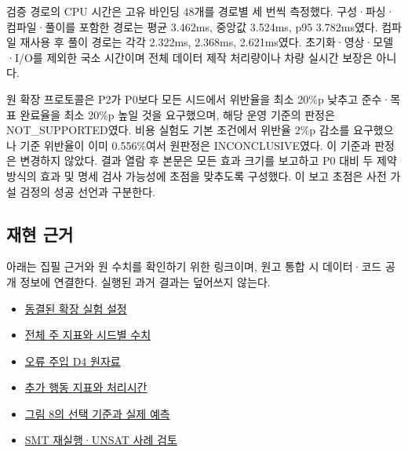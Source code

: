 \documentclass[11pt,a4paper]{article}
\begin{document}
검증 경로의 CPU 시간은 고유 바인딩 48개를 경로별 세 번씩 측정했다. 구성·파싱·컴파일·풀이를 포함한 경로는 평균 3.462ms, 중앙값 3.524ms, p95 3.782ms였다. 컴파일 재사용 후 풀이 경로는 각각 2.322ms, 2.368ms, 2.621ms였다. 초기화·영상·모델·I/O를 제외한 국소 시간이며 전체 데이터 제작 처리량이나 차량 실시간 보장은 아니다.\par

원 확장 프로토콜은 P2가 P0보다 모든 시드에서 위반율을 최소 20\%p 낮추고 준수·목표 완료율을 최소 20\%p 높일 것을 요구했으며, 해당 운영 기준의 판정은 NOT\_SUPPORTED였다. 비용 실험도 기본 조건에서 위반율 2\%p 감소를 요구했으나 기준 위반율이 이미 0.556\%여서 원판정은 INCONCLUSIVE였다. 이 기준과 판정은 변경하지 않았다. 결과 열람 후 본문은 모든 효과 크기를 보고하고 P0 대비 두 제약 방식의 효과 및 명세 검사 가능성에 초점을 맞추도록 구성했다. 이 보고 초점은 사전 가설 검정의 성공 선언과 구분한다.\par

\begingroup\small\setlength{\parskip}{3pt}
\subsection*{재현 근거}

아래는 집필 근거와 원 수치를 확인하기 위한 링크이며, 원고 통합 시 데이터·코드 공개 정보에 연결한다. 실행된 과거 결과는 덮어쓰지 않는다.\par

\begin{itemize}\setlength{\itemsep}{0pt}\setlength{\parsep}{0pt}\setlength{\topsep}{2pt}
\item \href{\detokenize{../temporal-expansion-protocol-2026-09-29-001/protocol.json}}{동결된 확장 실험 설정}
\item \href{\detokenize{../temporal-experiment-closure-2026-09-29-001/all_primary_metrics.csv}}{전체 주 지표와 시드별 수치}
\item \href{\detokenize{../../paper1-temporal-diversity-001/diversity-analysis-2026-09-29-001/RESULT.json}}{오류 주입 D4 원자료}
\item \href{\detokenize{../temporal-secondary-metrics-2026-09-29-001/RESULT.json}}{추가 행동 지표와 처리시간}
\item \href{\detokenize{selected_cases.json}}{그림 8의 선택 기준과 실제 예측}
\end{itemize}

\begin{itemize}\setlength{\itemsep}{0pt}\setlength{\parsep}{0pt}\setlength{\topsep}{2pt}
\item \href{\detokenize{unsat_review.json}}{SMT 재실행·UNSAT 사례 검토}
\end{itemize}
\endgroup
\end{document}

